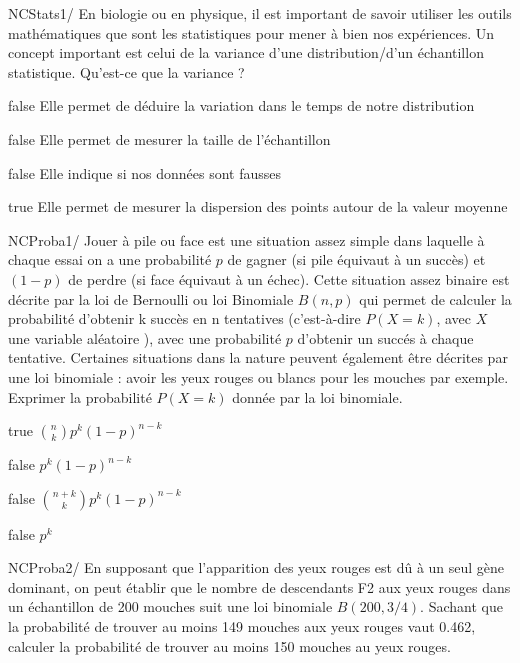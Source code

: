             \begin{question}{NC}{Stats}{1}{/} 
				En biologie ou en physique, il est important de savoir utiliser les outils mathématiques que sont les statistiques pour mener à bien nos expériences. Un concept important est celui de la variance d'une distribution/d'un échantillon statistique. Qu'est-ce que la variance ? 
            \end{question}
            \begin{reponses}
            	\item[false]  Elle permet de déduire la variation dans le temps de notre distribution
            	\item[false]  Elle permet de mesurer la taille de l'échantillon 
                \item[false]  Elle indique si nos données sont fausses
                \item[true]   Elle permet de mesurer la dispersion des points autour de la valeur moyenne 
            \end{reponses}
            \begin{question}{NC}{Proba}{1}{/} 
				Jouer à pile ou face est une situation assez simple dans laquelle à chaque essai on a une probabilité $p$ de gagner (si pile équivaut à un succès) et $(1-p)$ de perdre (si face équivaut à un échec). Cette situation assez binaire est décrite par la loi de Bernoulli ou loi Binomiale $B(n,p)$ qui permet de calculer la probabilité d'obtenir k succès en n tentatives (c'est-à-dire $P(X=k)$, avec $X$ une variable aléatoire ), avec une probabilité $p$ d'obtenir un succés à chaque tentative. Certaines situations dans la nature peuvent également être décrites par une loi binomiale : avoir les yeux rouges ou blancs pour les mouches par exemple. Exprimer la probabilité $P(X=k)$ donnée par la loi binomiale.
            \end{question}
            \begin{reponses}
            	\item[true]   $ \binom{n}{k}p^{k}(1-p)^{n-k}$
            	\item[false]  $  p^{k}(1-p)^{n-k}$
                \item[false]  $  \binom{n+k}{k}p^{k}(1-p)^{n-k}$
                \item[false]  $  p^{k}$
            \end{reponses}
            \begin{question}{NC}{Proba}{2}{/} 
 				En supposant que l'apparition des yeux rouges est dû à un seul gène dominant, on peut établir que le nombre de descendants F2 aux yeux rouges dans un échantillon de 200 mouches suit une loi binomiale $B(200,3/4)$. Sachant que la probabilité de trouver au moins 149 mouches aux yeux rouges vaut 0.462, calculer la probabilité de trouver au moins 150 mouches au yeux rouges.
            \end{question}
